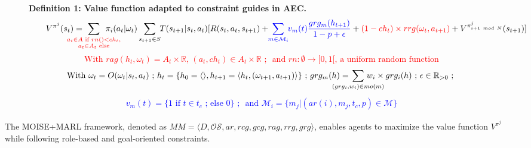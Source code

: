 \documentclass[conference]{IEEEtran}
\begin{document}
\begin{figure*}[t]
  \label{eq:single_value_function}
  \raggedright
  \textbf{\quad Definition 1: Value function adapted to constraint guides in AEC.}
  \begin{gather*}
    \text{\quad \quad} V^{\pi^j}(s_t) = \hspace{-0.75cm} \sum_{\textcolor{red}{ \substack{a_{t} \in A \text{ if } rn() < ch_{t}, \\ 
    a_{t} \in A_{t} \text{ else}}
    }}{\hspace{-0.7cm} \pi_i(a_{t} | \omega_t)} \sum_{s_{t+1} \in S}{\hspace{-0.1cm} T(s_{t+1} | s_t, a_{t})[R(s_t,a_{t},s_{t+1}) + \hspace{-0.1cm} \textcolor{blue}{ \sum_{m \in \mathcal{M}_i}{ \hspace{-0.1cm} v_m(t) \frac{grg_m(h_{t+1})}{1 - p + \epsilon} } } + \textcolor{red}{(1-ch_t) \times rrg(\omega_t,a_{t+1})} + V^{\pi^j_{i+1 \ mod \ N}}(s_{t+1})]}
  \end{gather*}  
  \textcolor{red}{\[\text{With } rag(h_t, \omega_t) = A_{t} \times \mathbb{R} \text{, } (a_t, ch_{t}) \in A_{t} \times \mathbb{R} \text{ ; } \text{ and } rn: \emptyset \to [0,1[ \text{, a uniform random function}\]}
  \vspace{-0.5cm}
  \textcolor{blue}{
  \begin{gather*}
  \text{With } \omega_t = O(\omega_t | s_t, a_t) \text{ ; } h_t = \{h_0 = \langle \rangle, h_{t+1} = \langle h_t, (\omega_{t+1}, a_{t+1}) \rangle \} \text{ ; } grg_m(h) = \hspace{-0.8cm} \sum_{(grg_i,w_i) \in mo(m)}{\hspace{-0.8cm} w_i \times grg_i(h)} \text{ ; } \epsilon \in \mathbb{R}_{>0} \text{ ; }
  \end{gather*}
  }
  \vspace{-0.75cm}
  \textcolor{blue}{
  \begin{gather*}
  v_m(t) = \{ 1 \text{ if } t \in t_c \text{ ; else } 0 \} \text{ ; } \text{ and } \mathcal{M}_i = \{m_j | (ar(i),m_j,t_c,p) \in \mathcal{M}\}
  \end{gather*}
  }
  \vspace{-0.6cm}
  \end{figure*}

The MOISE+MARL framework, denoted as $MM = \langle D, \mathcal{OS}, ar, rcg, \allowbreak gcg, rag, rrg, grg \rangle$, enables agents to maximize the value function $V^{\pi^{j}}$ while following role-based and goal-oriented constraints.
\end{document}
